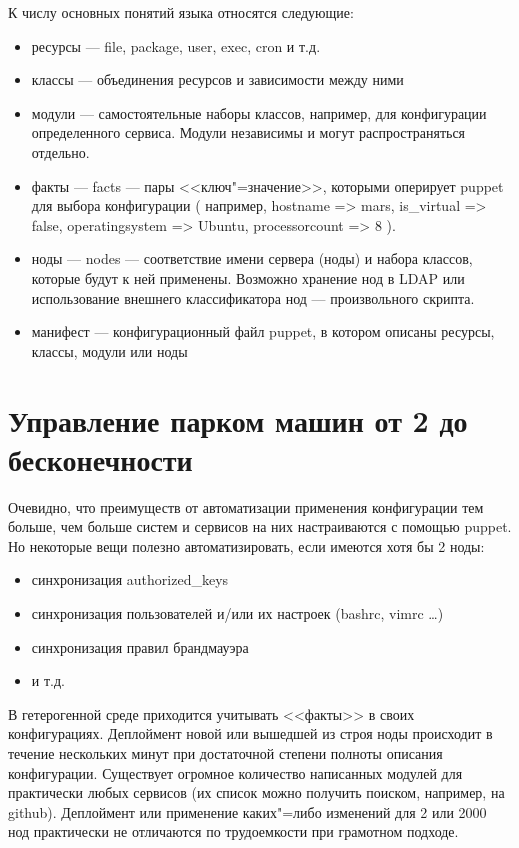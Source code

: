 \documentclass[10pt, a5paper]{article}
\begin{document}
К числу основных понятий языка относятся следующие:

\begin{itemize}
  \item ресурсы --- file, package, user, exec, cron и т.д.
  \item классы --- объединения ресурсов и зависимости между ними
  \item модули --- самостоятельные наборы классов, например, для конфигурации определенного сервиса. Модули независимы и могут распространяться отдельно.
  \item факты --- facts --- пары <<ключ"=значение>>, которыми оперирует puppet для выбора конфигурации ( например, hostname =\textgreater{} mars, is\_virtual =\textgreater{} false, operatingsystem =\textgreater{} Ubuntu, processorcount =\textgreater{} 8 ).
  \item ноды --- nodes --- соответствие имени сервера (ноды) и набора классов, которые будут к ней применены. Возможно хранение нод в LDAP или использование внешнего классификатора нод --- произвольного скрипта.
  \item манифест --- конфигурационный файл puppet, в котором описаны ресурсы, классы, модули или ноды
\end{itemize}

\section*{Управление парком машин от 2 до бесконечности}

Очевидно, что преимуществ от автоматизации применения конфигурации тем больше, чем больше систем и сервисов на них настраиваются с помощью puppet. Но некоторые вещи полезно автоматизировать, если имеются хотя бы 2 ноды:

\begin{itemize}
  \item синхронизация authorized\_keys
  \item синхронизация пользователей и/или их настроек (bashrc, vimrc \ldots{})
  \item синхронизация правил брандмауэра
  \item и т.д.
\end{itemize}

В гетерогенной среде приходится учитывать <<факты>> в своих конфигурациях. Деплоймент новой или вышедшей из строя ноды происходит в течение нескольких минут при достаточной степени полноты описания конфигурации. Существует огромное количество написанных модулей для практически любых сервисов (их список можно получить поиском, например, на github). Деплоймент или применение каких"=либо изменений для 2 или 2000 нод практически не отличаются по трудоемкости при грамотном подходе.
\end{document}

